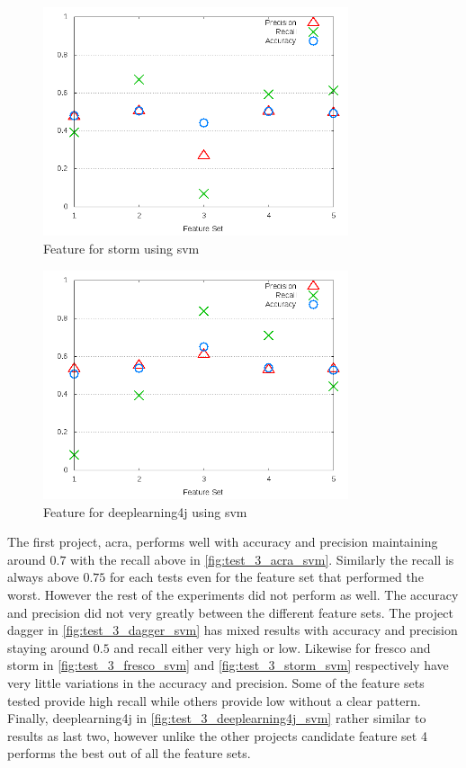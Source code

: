 \begin{figure}[!ht]
    \centering
        \includegraphics[width=0.8\textwidth]{images/svm/test_3/storm_sample_range}
        \caption{Feature for storm using \gls{svm}}
        \label{fig:test_3_storm_svm}
\end{figure}

\begin{figure}[!ht]
    \centering
        \includegraphics[width=0.8\textwidth]{images/svm/test_3/deeplearning4j_sample_range}
    \caption{Feature for deeplearning4j using \gls{svm}}
    \label{fig:test_3_deeplearning4j_svm}
\end{figure}

The first project, acra, performs well with accuracy and precision maintaining around $0.7$ with the recall above in \autoref{fig:test_3_acra_svm}. Similarly the recall is always above $0.75$ for each tests even for the feature set that performed the worst. However the rest of the experiments did not perform as well. The accuracy and precision did not very greatly between the different feature sets. The project dagger in \autoref{fig:test_3_dagger_svm} has mixed results with accuracy and precision staying around $0.5$ and recall either very high or low. Likewise for fresco and storm in \autoref{fig:test_3_fresco_svm} and \autoref{fig:test_3_storm_svm} respectively have very little variations in the accuracy and precision. Some of the feature sets tested provide high recall while others provide low without a clear pattern. Finally, deeplearning4j in \autoref{fig:test_3_deeplearning4j_svm} rather similar to results as last two, however unlike the other projects candidate feature set 4 performs the best out of all the feature sets.

